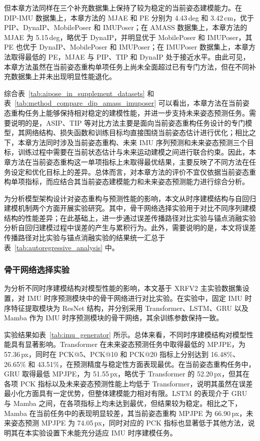但本章方法同样在三个补充数据集上保持了较为稳定的当前姿态建模能力。在 DIP-IMU 数据集上，本章方法的 MJAE 和 PE 分别为 4.43\,deg 和 3.42\,cm，优于 PIP、DynaIP、MobilePoser 和 IMUPoser；在 AMASS 数据集上，本章方法的 MJAE 为 5.15\,deg，略优于 DynaIP，并明显优于 MobilePoser 和 IMUPoser，其 PE 也优于 DynaIP、MobilePoser 和 IMUPoser；在 IMUPoser 数据集上，本章方法取得最低的 PE，MJAE 与 PIP、TIP 和 DynaIP 处于接近水平。由此可见，本章方法虽然在当前姿态重构单项任务上尚未全面超过已有专门方法，但在不同补充数据集上并未出现明显性能退化。

综合表~\ref{tab:aipose_in_supplement_datasets} 和表~\ref{tab:method_compare_dip_amass_imuposer} 可以看出，本章方法在当前姿态重构任务上能够保持相对稳定的建模性能，并进一步支持未来姿态预测任务。需要说明的是，ASIP、TIP 等对比方法主要是面向当前姿态重构任务设计的专门模型，其网络结构、损失函数和训练目标均直接围绕当前姿态估计进行优化；相比之下，本章方法同时涉及当前姿态重构、未来 IMU 序列预测和未来姿态预测三个目标，训练过程中需要在当前状态估计与未来运动建模之间进行联合约束。因此，本章方法在当前姿态重构这一单项指标上未取得最优结果，主要反映了不同方法在任务设定和优化目标上的差异。总体而言，对本章方法的评价不宜仅依据当前姿态重构单项指标，而应结合其当前姿态建模能力和未来姿态预测能力进行综合分析。


为分析模型架构设计对姿态重构与预测性能的影响，本文从时序建模结构与自回归建模机制两个方面开展实验研究。其中，骨干网络选择实验用于对比不同序列建模结构的性能差异；在此基础上，进一步通过误差传播路径对比实验与锚点消融实验分析自回归建模过程中误差的产生与累积行为。此外，需要说明的是，本文将误差传播路径对比实验与锚点消融实验的结果统一汇总于表~\ref{tab:autoregressive_analysis} 中。

\subsubsection{骨干网络选择实验}{}

为分析不同时序建模结构对模型性能的影响，本文基于 XRFV2 主实验数据集设置，对 IMU 时序预测模块中的骨干网络进行对比实验。在实验中，固定 IMU 时序特征提取模块为 ResNet 结构\cite{he2016deep}，并分别采用 Transformer\cite{vaswani2017attention}、LSTM\cite{hochreiter1997long}、GRU\cite{cho2014learning} 以及 Mamba\cite{gu2024mamba} 作为 IMU 时序预测模块的骨干网络，其余训练参数保持一致。

实验结果如表~\ref{tab:imu_generator} 所示。总体来看，不同时序建模结构对模型性能具有显著影响。Transformer 在未来姿态预测任务中取得最低的 MPJPE，为 57.36\,px，同时在 PCK@5、PCK@10 和 PCK@20 指标上分别达到 16.48\%、26.65\% 和 43.51\%，在预测精度与稳定性方面表现最优。在当前姿态重构任务中，GRU 取得最低 MPJPE，为 51.55\,px，略优于 Transformer 的 52.20\,px，但其在各项 PCK 指标以及未来姿态预测性能上均低于 Transformer，说明其虽然在误差最小化方面具有一定优势，但整体建模能力相对有限。LSTM 的表现介于 GRU 与 Mamba 之间，在各项指标上均未达到最优，但结果较为稳定。相比之下，Mamba 在当前任务中的表现明显较差，其当前姿态重构 MPJPE 为 66.90\,px，未来姿态预测 MPJPE 为 74.05\,px，同时对应的 PCK 指标也显著低于其他方法，说明其在本实验设置下未能充分适应 IMU 时序建模任务。

